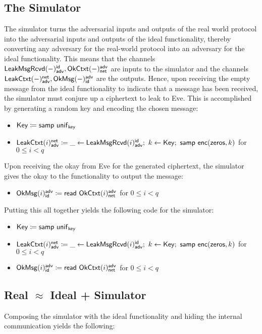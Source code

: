 \subsection{The Simulator}
The simulator turns the adversarial inputs and outputs of the real world protocol into the adversarial inputs and outputs of the ideal functionality, thereby converting any adversary for the real-world protocol into an adversary for the ideal functionality. This means that the channels $\mathsf{LeakMsgRcvd}(-)^{\mathsf{id}}_{\mathsf{adv}}, \mathsf{OkCtxt}(-)^{\mathsf{adv}}_{\mathsf{net}}$ are inputs to the simulator and the channels $\mathsf{LeakCtxt}(-)^{\mathsf{net}}_{\mathsf{adv}}, \mathsf{OkMsg}(-)^{\mathsf{adv}}_{\mathsf{id}}$ are the outputs. Hence, upon receiving the empty message from the ideal functionality to indicate that a message has been received, the simulator must conjure up a ciphertext to leak to Eve. This is accomplished by generating a random key and encoding the chosen message:
\begin{itemize}
\item $\mathsf{Key} \coloneqq \mathsf{samp} \ \mathsf{unif}_{\mathsf{key}}$
\item $\LeakCtxt(i)^\net_\adv \coloneqq \_ \leftarrow \LeakMsgRcvd(i)^\id_\adv; \ k \leftarrow \Key; \ \samp{\enc(\zeros,k)}$ for $0 \leq i < q$
\end{itemize}
Upon receiving the okay from Eve for the generated ciphertext, the simulator gives the okay to the functionality to output the message:
\begin{itemize}
\item $\mathsf{OkMsg}(i)^{\mathsf{adv}}_{\mathsf{id}} \coloneqq \mathsf{read} \ \mathsf{OkCtxt}(i)^{\mathsf{adv}}_{\mathsf{net}}$ for $0 \leq i < q$
\end{itemize}
Putting this all together yields the following code for the simulator:
\begin{itemize}
\item $\mathsf{Key} \coloneqq \mathsf{samp} \ \mathsf{unif}_{\mathsf{key}}$
\item $\LeakCtxt(i)^\net_\adv \coloneqq \_ \leftarrow \LeakMsgRcvd(i)^\id_\adv; \ k \leftarrow \Key; \ \samp{\enc(\zeros,k)}$ for $0 \leq i < q$
\item $\mathsf{OkMsg}(i)^{\mathsf{adv}}_{\mathsf{id}} \coloneqq \mathsf{read} \ \mathsf{OkCtxt}(i)^{\mathsf{adv}}_{\mathsf{net}}$ for $0 \leq i < q$
\end{itemize}

\subsection{Real \texorpdfstring{$\approx$}{Approximates} Ideal + Simulator}
Composing the simulator with the ideal functionality and hiding the internal communication yields the following:

